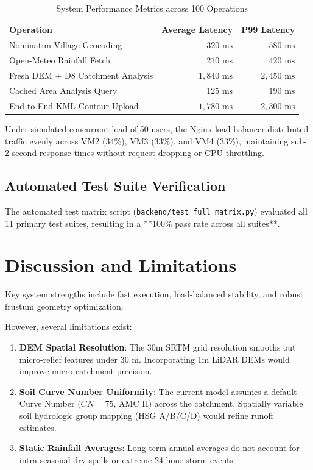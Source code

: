 \documentclass[manuscript,screen]{acmart}
\begin{document}
\begin{table}[h]
  \caption{System Performance Metrics across 100 Operations}
  \label{tab:performance}
  \begin{tabular}{lrr}
    \toprule
    Operation & Average Latency & P99 Latency \\
    \midrule
    Nominatim Village Geocoding & $320\text{ ms}$ & $580\text{ ms}$ \\
    Open-Meteo Rainfall Fetch & $210\text{ ms}$ & $420\text{ ms}$ \\
    Fresh DEM + D8 Catchment Analysis & $1,840\text{ ms}$ & $2,450\text{ ms}$ \\
    Cached Area Analysis Query & $125\text{ ms}$ & $190\text{ ms}$ \\
    End-to-End KML Contour Upload & $1,780\text{ ms}$ & $2,300\text{ ms}$ \\
    \bottomrule
  \end{tabular}
\end{table}

Under simulated concurrent load of 50 users, the Nginx load balancer distributed traffic evenly across VM2 (34\%), VM3 (33\%), and VM4 (33\%), maintaining sub-2-second response times without request dropping or CPU throttling.

\subsection{Automated Test Suite Verification}
The automated test matrix script (\texttt{backend/test\_full\_matrix.py}) evaluated all 11 primary test suites, resulting in a **$100\%$ pass rate across all suites**.

\section{Discussion and Limitations}
\label{sec:discussion}
Key system strengths include fast execution, load-balanced stability, and robust frustum geometry optimization.

However, several limitations exist:
\begin{enumerate}[leftmargin=*]
    \item \textbf{DEM Spatial Resolution}: The 30m SRTM grid resolution smooths out micro-relief features under $30\text{ m}$. Incorporating 1m LiDAR DEMs would improve micro-catchment precision.
    \item \textbf{Soil Curve Number Uniformity}: The current model assumes a default Curve Number ($CN = 75$, AMC II) across the catchment. Spatially variable soil hydrologic group mapping (HSG A/B/C/D) would refine runoff estimates.
    \item \textbf{Static Rainfall Averages}: Long-term annual averages do not account for intra-seasonal dry spells or extreme 24-hour storm events.
\end{enumerate}
\end{document}

